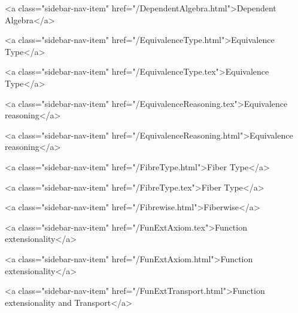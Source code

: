       
    
      
        
          <a class="sidebar-nav-item" href="/DependentAlgebra.html">Dependent Algebra</a>
        
      
    
      
        
          <a class="sidebar-nav-item" href="/EquivalenceType.html">Equivalence Type</a>
        
      
    
      
        
          <a class="sidebar-nav-item" href="/EquivalenceType.tex">Equivalence Type</a>
        
      
    
      
        
          <a class="sidebar-nav-item" href="/EquivalenceReasoning.tex">Equivalence reasoning</a>
        
      
    
      
        
          <a class="sidebar-nav-item" href="/EquivalenceReasoning.html">Equivalence reasoning</a>
        
      
    
      
        
          <a class="sidebar-nav-item" href="/FibreType.html">Fiber Type</a>
        
      
    
      
        
          <a class="sidebar-nav-item" href="/FibreType.tex">Fiber Type</a>
        
      
    
      
        
          <a class="sidebar-nav-item" href="/Fibrewise.html">Fiberwise</a>
        
      
    
      
        
          <a class="sidebar-nav-item" href="/FunExtAxiom.tex">Function extensionality</a>
        
      
    
      
        
          <a class="sidebar-nav-item" href="/FunExtAxiom.html">Function extensionality</a>
        
      
    
      
        
          <a class="sidebar-nav-item" href="/FunExtTransport.html">Function extensionality and Transport</a>
        
